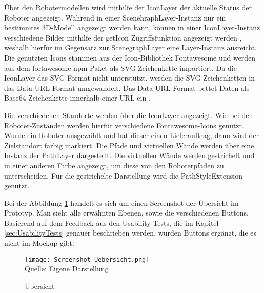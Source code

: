Über den Robotermodellen wird mithilfe der IconLayer der aktuelle Status der Roboter angezeigt. Während in einer ScenehraphLayer-Instanz nur ein bestimmtes 3D-Modell angezeigt werden kann, können in einer IconLayer-Instanz verschiedene Bilder mithilfe der getIcon Zugriffsfunktion angezeigt werden \cite{DeckglIconLayer}, weshalb hierfür im Gegensatz zur ScenegraphLayer eine Layer-Instanz ausreicht. Die genutzten Icons stammen aus der Icon-Bibliothek Fontawesome und werden aus dem fortawesome \ac{npm}-Paket als \ac{SVG}-Zeichenkette importiert. Da die IconLayer das \ac{SVG} Format nicht unterstützt, werden die \ac{SVG}-Zeichenketten in das Data-\ac{URL} Format umgewandelt. Das Data-\ac{URL} Format bettet Daten als \gls{Base64}-Zeichenkette innerhalb einer \ac{URL} ein \cite{DataUrl}.

Die verschiedenen Standorte werden über die IconLayer angezeigt. Wie bei den Roboter-Zuständen werden hierfür verschiedene Fontawesome-Icons genutzt. Wurde ein Roboter ausgewählt und hat dieser einen Lieferauftrag, dann wird der Zielstandort farbig markiert. Die Pfade und virtuellen Wände werden über eine Instanz der PathLayer \cite{DeckglPathLayer} dargestellt. Die virtuellen Wände werden gestrichelt und in einer anderen Farbe angezeigt, um diese von den Roboterpfaden zu unterscheiden. Für die gestrichelte Darstellung wird die PathStyleExtension \cite{DeckglPathStyleExtension} genutzt.

Bei der Abbildung \ref{fig:OverviewScreenshot} handelt es sich um einen Screenshot der Übersicht im Prototyp. Man sieht alle erwähnten Ebenen, sowie die verschiedenen Buttons. Basierend auf dem Feedback aus den Usability Tests, die im Kapitel \ref{sec:UsabilityTests} genauer beschrieben werden, wurden Buttons ergänzt, die es nicht im Mockup gibt.

\begin{figure}[H]
    \caption{Übersicht}\label{fig:OverviewScreenshot}
    \texttt{[image: Screenshot Uebersicht.png]}
    \\
    Quelle: Eigene Darstellung
\end{figure}

